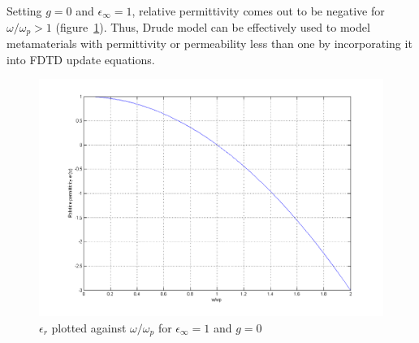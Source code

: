 Setting $g=0$ and $\epsilon_\infty=1$, relative permittivity comes out to be negative for $\omega/\omega_p > 1$ (figure~\ref{DrudeModel_er}). Thus, Drude model can be effectively used to model metamaterials with permittivity or permeability less than one by incorporating it into FDTD update equations.
\begin{figure}[H]
\centering
\includegraphics[scale=0.4]{FigCh03_DrudeModel_er.png}
\caption{$\epsilon_r$ plotted against $\omega/\omega_p$ for $\epsilon_\infty=1$ and $g=0$}
\label{DrudeModel_er}
\end{figure}

